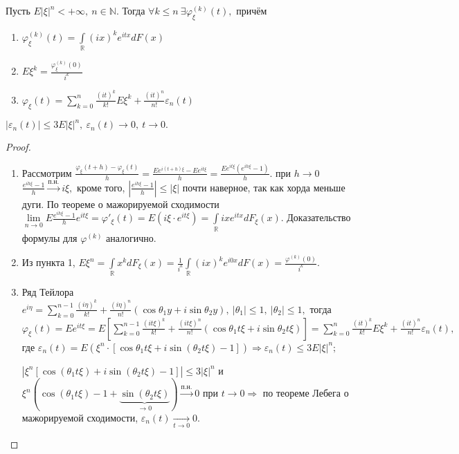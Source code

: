 	\begin{property}
	\begin{theorem}[о производящих х.ф.]
		Пусть \(E|\xi|^n < + \infty, ~n \in \mathbb{N}.\) Тогда \(\forall k \leqslant n~ \exists \varphi_\xi^{(k)}(t),\) причём
		\begin{enumerate}
			\item \(\varphi_\xi^{(k)}(t) = \int\limits_\mathbb{R}(ix)^ke^{itx}dF(x)\)
			\item \(E\xi^k = \frac{\varphi_\xi^{(k)}(0)}{i^k}\)
			\item \(\varphi_\xi(t) = \sum\limits_{k = 0}^{n} \frac{(it)^k}{k!}E\xi^k + \frac{(it)^n}{n!}\varepsilon_n(t)\)
		\end{enumerate}
		\(|\varepsilon_n(t)| \leqslant 3E|\xi|^n, ~\varepsilon_n(t) \to 0, ~ t \to 0.\)
	\end{theorem}
	\begin{proof}
		\begin{enumerate}
			\item Рассмотрим \(\frac{\varphi_\xi(t + h) - \varphi_\xi(t)}{h} = \frac{Ee^{i(t + h)\xi} - Ee^{it\xi}}{h} = \frac{Ee^{it\xi}(e^{ih\xi} - 1)}{h}.\) при \(h \to 0\) \(\frac{e^{ih\xi} - 1}{h} \overset{\text{п.н.}}{\longrightarrow}i\xi,\) кроме того, \(\left|\frac{e^{ih\xi} - 1}{h}\right| \leqslant |\xi|\) почти наверное, так как хорда меньше дуги. По теореме о мажорируемой сходимости
			\(\lim\limits_{n \to 0}E \frac{e^{ih\xi} - 1}{h}e^{it\xi} = \varphi'_\xi(t) = E(i\xi\cdot e^{it\xi}) = \int\limits_\mathbb{R} ixe^{itx}dF_\xi(x).\) Доказательство формулы для \(\varphi^{(k)}\) аналогично.
			\item Из пункта 1, \(E\xi^n = \int\limits_\mathbb{R}x^k dF_\xi(x) = \frac{1}{i^k} \int\limits_\mathbb{R}(ix)^ke^{i0x}dF(x) = \frac{\varphi^{(k)}(0)}{i^k}.\)
			\item Ряд Тейлора \(e^{i\eta} = \sum\limits_{k = 0}^{n - 1} \frac{(i\eta)^k}{k!} + \frac{(i\eta)^n}{n!}(\cos\theta_1y + i\sin\theta_2 y), ~|\theta_1| \leqslant 1, ~ |\theta_2| \leqslant 1,\) тогда
			\(\varphi_\xi(t) = Ee^{it\xi} = E\left[\sum\limits_{k = 0}^{n - 1} \frac{(it\xi)^k}{k!} + \frac{(it\xi)^n}{n!}(\cos\theta_1 t\xi + i\sin \theta_2 t\xi)\right] = \sum\limits_{k = 0}^{n}\frac{(it)^k}{k!}E\xi^k + \frac{(it)^n}{n!}\varepsilon_n(t), \) где \(\varepsilon_n(t) = E(\xi^n\cdot [\cos\theta_1t\xi + i\sin(\theta_2 t\xi) - 1]) \Rightarrow \varepsilon_n(t) \leqslant 3E|\xi|^n;\)

			\(|\xi^n[\cos(\theta_1t\xi) + i\sin(\theta_2t\xi) - 1]| \leqslant3|\xi|^n\) и \(\xi^n(\cos(\theta_1t\xi) - 1 + \underbrace{\sin(\theta_2 t\xi)}_{\to 0}) \overset{\text{п.н.}}{\longrightarrow} 0\) при \(t \to 0 \Rightarrow\) по теореме Лебега о мажорируемой сходимости, \(\varepsilon_n(t) \underset{t \to 0}{\longrightarrow} 0.\)
		\end{enumerate}
	\end{proof}
	\end{property}
